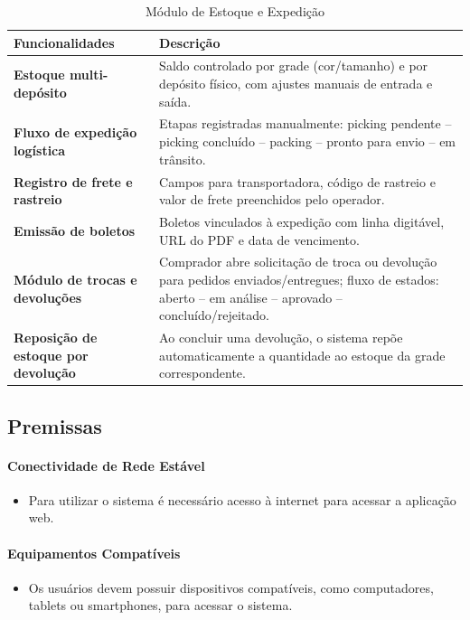 \documentclass[12pt,a4paper]{article}
\begin{document}
\begin{table}[h!]
  \centering
  \begin{tabularx}{\textwidth}{>{\bfseries}X X}
    \toprule
    Funcionalidades & Descrição \\
    \midrule
    Estoque multi-depósito &
      Saldo controlado por grade (cor/tamanho) e por depósito físico, com ajustes manuais de entrada e saída. \\
    \addlinespace
    Fluxo de expedição logística &
      Etapas registradas manualmente: picking pendente -- picking concluído -- packing -- pronto para envio -- em trânsito. \\
    \addlinespace
    Registro de frete e rastreio &
      Campos para transportadora, código de rastreio e valor de frete preenchidos pelo operador. \\
    \addlinespace
    Emissão de boletos &
      Boletos vinculados à expedição com linha digitável, URL do PDF e data de vencimento. \\
    \addlinespace
    Módulo de trocas e devoluções &
      Comprador abre solicitação de troca ou devolução para pedidos enviados/entregues; fluxo de estados: aberto -- em análise -- aprovado -- concluído/rejeitado. \\
    \addlinespace
    Reposição de estoque por devolução &
      Ao concluir uma devolução, o sistema repõe automaticamente a quantidade ao estoque da grade correspondente. \\
    \bottomrule
  \end{tabularx}
  \caption{Módulo de Estoque e Expedição}
\end{table}

\subsection{Premissas}

\paragraph*{Conectividade de Rede Estável}
\begin{itemize}
  \item Para utilizar o sistema é necessário acesso à internet para acessar a aplicação web.
\end{itemize}

\paragraph*{Equipamentos Compatíveis}
\begin{itemize}
  \item Os usuários devem possuir dispositivos compatíveis, como computadores, tablets ou smartphones, para acessar o sistema.
\end{itemize}
\end{document}
